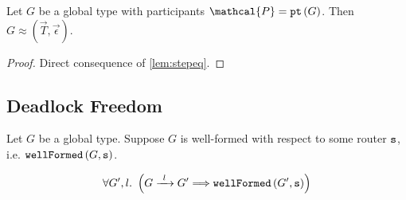 \begin{theorem}
Let $G$ be a global type with participants 
$\mathcal{P} = \pt{G}$.
Then $G \approx (\vec T, \vec \epsilon)$.

\label{th:traceeq}
\end{theorem}

\begin{proof}
Direct consequence of \cref{lem:stepeq}.
\end{proof}

\subsection{Deadlock Freedom}
\label{subsection:newdeadlockfreedom}

\begin{lemma}
Let $G$ be a global type.
Suppose $G$ is well-formed with respect to some router ${\mathtt{s}}$,
i.e. $\textnormal{\texttt{wellFormed}}\left(G, {\mathtt{s}}\right)$.

\[
\forall G', l. ~
\left(\treduce{G}{G'}{l}
	\Longrightarrow
\wfnew{G'}{s}\right)
\]

\label{lem:preservewf}
\end{lemma}

